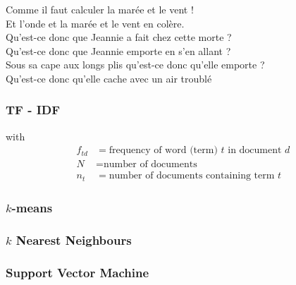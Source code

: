 \begin{frame}[t]
{   Comme il faut calculer la marée et le vent !\\
   Et l'onde et la marée et le vent en colère.\\[5mm]

   Qu'est-ce donc que Jeannie a fait chez cette morte ?\\
   Qu'est-ce donc que Jeannie emporte en s'en allant ?\\[5mm]

   Sous sa cape aux longs plis qu'est-ce donc qu'elle emporte ?\\
   Qu'est-ce donc qu'elle cache avec un air troublé
  }
\end{frame}

\begin{frame}
  \frametitle{TF - IDF}

  with
  \begin{align*}
    f_{td} &= \mbox{frequency of word (term) $t$ in document $d$} \\
    N &= \mbox{number of documents}\\
    n_t &= \mbox{number of documents containing term $t$}
  \end{align*}
\end{frame}

\begin{frame}
  \frametitle{$k$-means}
\end{frame}

\begin{frame}
  \frametitle{$k$ Nearest Neighbours}
\end{frame}

\begin{frame}
  \frametitle{Support Vector Machine}
\end{frame}

